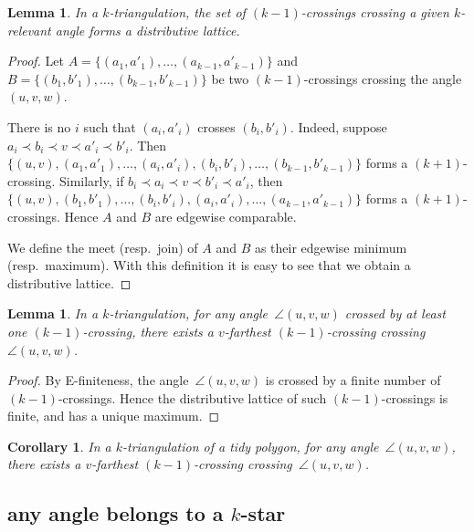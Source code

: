 \documentclass{amsart}
\newtheorem{lemma}[theorem]{Lemma}
\newtheorem{corollary}[theorem]{Corollary}
\theoremstyle{remark}
\newcommand*{\ef}[0]{E-finite\xspace}
\newcommand*{\ktg}[0]{$k$-triangulation\xspace}
\newcommand{\cl}{\prec}
\begin{document}
\begin{lemma}
In a \ktg, the set of $(k-1)$-crossings crossing a given $k$-relevant angle forms a distributive lattice.
\end{lemma}
\begin{proof}
Let $A = \{(a_1, a'_1), \dots, (a_{k-1}, a'_{k-1})\}$ and $B = \{(b_1, b'_1), \dots,(b_{k-1}, b'_{k-1})\}$ be two $(k-1)$-crossings crossing the angle $(u,v,w)$.

There is no $i$ such that $(a_i, a'_i)$ crosses $(b_i, b'_i)$. 
Indeed, suppose $a_i \cl b_i \cl v \cl a'_i \cl b'_i$. Then $\{(u, v), (a_1, a'_1), \dots, (a_i, a'_i), (b_i, b'_i), \dots, (b_{k-1}, b'_{k-1})\}$ forms a $(k+1)$-crossing. 
Similarly, if $b_i \cl a_i \cl v \cl b'_i \cl a'_i$, then $\{(u, v), (b_1, b'_1), \dots, (b_i, b'_i), (a_i, a'_i), \dots, (a_{k-1}, a'_{k-1})\}$ forms a $(k+1)$-crossings.
Hence $A$ and $B$ are edgewise comparable.

We define the meet (resp.~join) of $A$ and $B$ as their edgewise minimum (resp.~maximum). With this definition it is easy to see that we obtain a distributive lattice.
\end{proof}

\begin{lemma}
In a \ktg, for any angle~$\angle(u,v,w)$ crossed by at least one $(k-1)$-crossing, there exists a $v$-farthest $(k-1)$-crossing crossing~$\angle(u,v,w)$.
\end{lemma}
\begin{proof}
By \ef{}ness, the angle~$\angle(u,v,w)$ is crossed by a finite number of $(k-1)$-crossings. Hence the distributive lattice of such $(k-1)$-crossings is finite, and has a unique maximum.
\end{proof}

\begin{corollary}
In a \ktg of a tidy polygon, for any angle~$\angle(u,v,w)$, there exists a $v$-farthest $(k-1)$-crossing crossing~$\angle(u,v,w)$.
\end{corollary}


\subsection{any angle belongs to a $k$-star}
\end{document}
